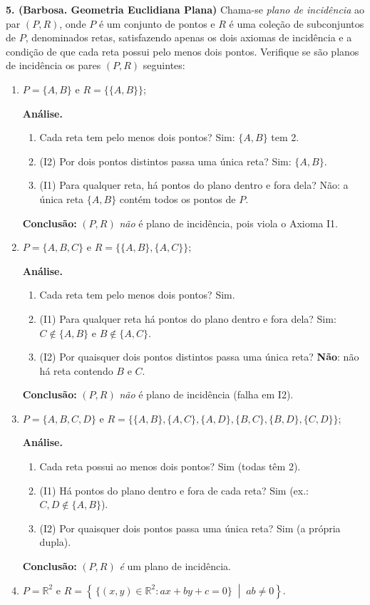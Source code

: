 \documentclass[12pt,a4paper]{article}
\begin{document}
\textbf{5. (Barbosa. Geometria Euclidiana Plana)} 
Chama-se \emph{plano de incidência} ao par $(P,R)$, onde $P$ é um conjunto de pontos e $R$ é uma coleção de subconjuntos de $P$, denominados retas, satisfazendo apenas os dois axiomas de incidência e a condição de que cada reta possui pelo menos dois pontos. Verifique se são planos de incidência os pares $(P,R)$ seguintes:
\begin{enumerate}[label=\alph*)]
    \item $P=\{A,B\}$ e $R=\big\{\{A,B\}\big\}$;

    \textbf{Análise.}
    \begin{enumerate}[label=(\arabic*)]
    \item Cada reta tem pelo menos dois pontos? Sim: $\{A,B\}$ tem 2.
    \item (I2) Por dois pontos distintos passa uma única reta? Sim: $\{A,B\}$.
    \item (I1) Para qualquer reta, há pontos do plano dentro e fora dela? Não:
    a única reta $\{A,B\}$ contém todos os pontos de $P$.
    \end{enumerate}
    
    \textbf{Conclusão:} $(P,R)$ \emph{não} é plano de incidência, pois viola o Axioma I1.
    
    \item $P=\{A,B,C\}$ e $R=\big\{\{A,B\},\{A,C\}\big\}$;

    \textbf{Análise.}
    \begin{enumerate}[label=(\arabic*)]
    \item Cada reta tem pelo menos dois pontos? Sim.
    \item (I1) Para qualquer reta há pontos do plano dentro e fora dela? Sim: 
    $C\notin\{A,B\}$ e $B\notin\{A,C\}$.
    \item (I2) Por quaisquer dois pontos distintos passa uma única reta? \textbf{Não}: 
    não há reta contendo $B$ e $C$.
    \end{enumerate}
    
    \textbf{Conclusão:} $(P,R)$ \emph{não} é plano de incidência (falha em I2).
    
    \item $P=\{A,B,C,D\}$ e $R=\big\{\{A,B\},\{A,C\},\{A,D\},\{B,C\},\{B,D\},\{C,D\}\big\}$;

    \textbf{Análise.}
    \begin{enumerate}[label=(\arabic*)]
    \item Cada reta possui ao menos dois pontos? Sim (todas têm 2).
    \item (I1) Há pontos do plano dentro e fora de cada reta? Sim (ex.: $C,D\notin\{A,B\}$).
    \item (I2) Por quaisquer dois pontos passa uma única reta? Sim (a própria dupla).
    \end{enumerate}
    
    \textbf{Conclusão:} $(P,R)$ \textit{é} um plano de incidência.
    
    \item $P=\mathbb{R}^{2}$ e 
          $R=\left\{\,\{(x,y)\in\mathbb{R}^{2} : ax+by+c=0\}\; \middle|\; ab\neq 0 \right\}$.
          
\end{enumerate}


\medskip

    \vspace{0.4cm}
  
\end{document}
